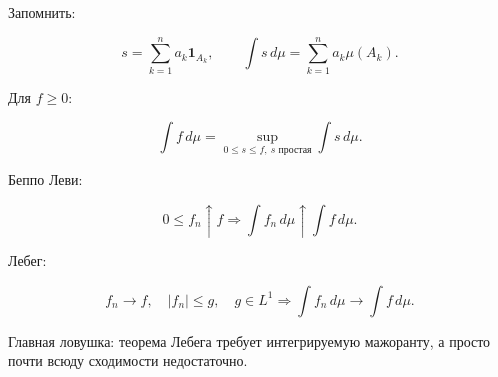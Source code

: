 \documentclass[
  11pt,
  a4paper,
]{article}
\begin{document}
Запомнить:

\[
s=\sum_{k=1}^n a_k\mathbf 1_{A_k},
\qquad
\int s\,d\mu=\sum_{k=1}^n a_k\mu(A_k).
\]

Для \(f\ge0\):

\[
\int f\,d\mu
=
\sup_{0\le s\le f,\ s\text{ простая}}
\int s\,d\mu.
\]

Беппо Леви:

\[
0\le f_n\uparrow f
\Rightarrow
\int f_n\,d\mu\uparrow\int f\,d\mu.
\]

Лебег:

\[
f_n\to f,\quad |f_n|\le g,\quad g\in L^1
\Rightarrow
\int f_n\,d\mu\to\int f\,d\mu.
\]

Главная ловушка: теорема Лебега требует интегрируемую мажоранту, а
просто почти всюду сходимости недостаточно.

\newpage
\end{document}
